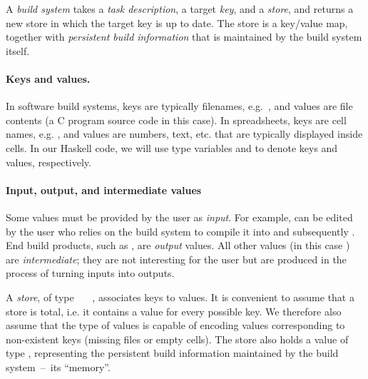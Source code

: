 \vspace{1mm}
A \emph{build system} takes a \emph{task description}, a target \emph{key},
and a \emph{store}, and returns a new store in which the target key is
up to date. The store is a key/value map, together with \emph{persistent build
information} that is maintained by the build system itself.

\vspace{-2mm}
\paragraph{Keys and values.} In software build systems, keys are typically filenames,
e.g.~, and values are file contents (a C program source
code in this case). In spreadsheets, keys are cell names,
e.g. , and values are numbers, text, etc. that are typically
displayed inside cells. In our Haskell code, we will use type
variables  and  to denote keys and values, respectively.

\vspace{-2mm}
\paragraph{Input, output, and intermediate values}
Some values must be provided by the user as \emph{input}. For example,
 can be edited by the user who relies on the build system to
compile it into  and subsequently . End build products,
such as , are \emph{output} values. All other values (in this case
) are \emph{intermediate}; they are not interesting for the user
but are produced in the process of turning inputs into outputs.

A \emph{store}, of type ~~~, associates keys to
values. It is convenient to assume that a store is total, i.e. it contains a
value for every possible key. We therefore also assume that the type of values
is capable of encoding values corresponding to non-existent keys (missing files
or empty cells). The store also holds a value of type ,
representing the persistent build information maintained by the build
system~--~its ``memory''.

